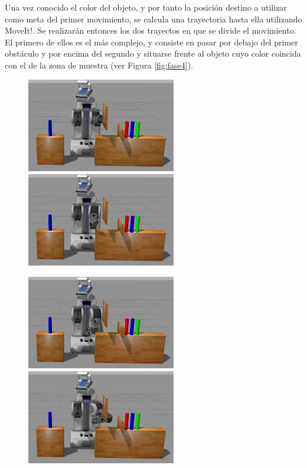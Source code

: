 \documentclass[12pt,spanish,chapterprefix, numbers=noenddot]{book}
\numberwithin{equation}{section}
\numberwithin{figure}{section}
\begin{document}
Una vez conocido el color del objeto, y por tanto la posición destino a utilizar como meta del primer movimiento, se calcula una trayectoria hasta ella utilizando MoveIt!. Se realizarán entonces los dos trayectos en que se divide el movimiento. El primero de ellos es el más complejo, y consiste en pasar por debajo del primer obstáculo y por encima del segundo y situarse frente al objeto cuyo color coincida con el de la zona de muestra (ver Figura \ref{fig:fase4}). 

\begin{figure}[hbt!]
\centering
\includegraphics[width=6.5cm]{Figs/frame358.png}
\includegraphics[width=6.5cm]{Figs/frame1000.png}
\par
\centering
\includegraphics[width=6.5cm]{Figs/frame1300.png}
\includegraphics[width=6.5cm]{Figs/frame1500.png}
\par

\end{figure}
\end{document}
